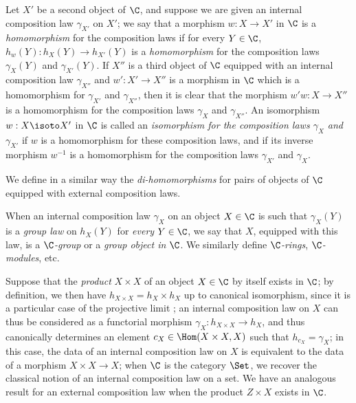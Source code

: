 \begin{env}[8.2.2]
\label{0.8.2.2}
Let $X'$ be a second object of $\C$, and suppose we are given an internal composition law $\gamma_{X'}$ on $X'$; we say that a morphism $w:X\to X'$ in $\C$ is a \emph{homomorphism} for the composition laws if for every $Y\in\C$, $h_w(Y):h_X(Y)\to h_{X'}(Y)$ is a \emph{homomorphism} for the composition laws $\gamma_X(Y)$ and $\gamma_{X'}(Y)$.
If $X''$ is a third
object of $\C$ equipped with an internal composition law $\gamma_{X''}$ and $w':X'\to X''$ is a morphism in $\C$ which is a homomorphism for $\gamma_{X'}$ and $\gamma_{X''}$, then it is clear that the morphism $w'w:X\to X''$ is a homomorphism for the composition laws $\gamma_X$ and $\gamma_{X''}$.
An isomorphism $w:X\isoto X'$ in $\C$ is called an \emph{isomorphism for the composition laws $\gamma_X$ and $\gamma_{X'}$} if $w$ is a homomorphism for these composition laws, and if its inverse morphism $w^{-1}$ is a homomorphism for the composition laws $\gamma_{X'}$ and $\gamma_X$.

We define in a similar way the \emph{di-homomorphisms} for pairs of objects of $\C$ equipped with external composition laws.
\end{env}

\begin{env}[8.2.3]
\label{0.8.2.3}
When an internal composition law $\gamma_X$ on an object $X\in\C$ is such that $\gamma_X(Y)$ is a \emph{group law} on $h_X(Y)$ for \emph{every} $Y\in\C$, we say that $X$, equipped with this law, is a \emph{$\C$-group} or a \emph{group object in $\C$}.
We similarly define \emph{$\C$-rings}, \emph{$\C$-modules}, etc.
\end{env}

\begin{env}[8.2.4]
\label{0.8.2.4}
Suppose that the \emph{product} $X\times X$ of an object $X\in\C$ by itself exists in $\C$; by definition, we then have $h_{X\times X}=h_X\times h_X$ up to canonical isomorphism, since it is a particular case of the projective limit ; an internal composition law on $X$ can thus be considered as a functorial morphism $\gamma_X:h_{X\times X}\to h_X$, and thus canonically determines  an element $c_X\in\Hom(X\times X,X)$ such that $h_{c_X}=\gamma_X$; in this case, the data of an internal composition law on $X$ is equivalent to the data of a morphism $X\times X\to X$; when $\C$ is the category $\Set$, we recover the classical notion of an internal composition law on a set.
We have an analogous result for an external composition law when the product $Z\times X$ exists in $\C$.
\end{env}

